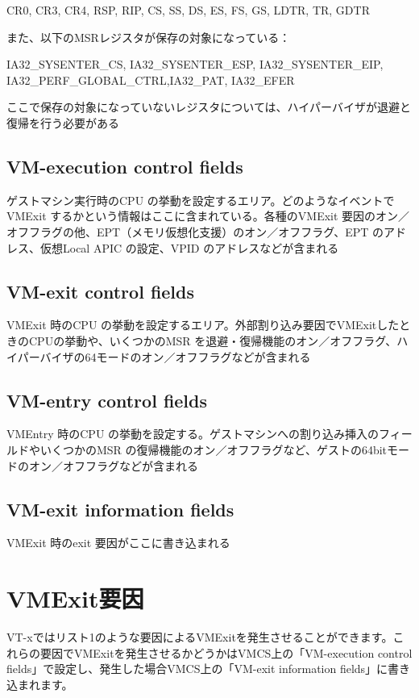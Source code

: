 CR0, CR3, CR4, RSP, RIP, CS, SS, DS, ES, FS, GS, LDTR, TR, GDTR

また、以下のMSRレジスタが保存の対象になっている：

IA32\_SYSENTER\_CS, IA32\_SYSENTER\_ESP, IA32\_SYSENTER\_EIP, IA32\_PERF\_GLOBAL\_CTRL,IA32\_PAT, IA32\_EFER

ここで保存の対象になっていないレジスタについては、ハイパーバイザが退避と復帰を行う必要がある

\subsection*{VM-execution control fields}
ゲストマシン実行時のCPU の挙動を設定するエリア。どのようなイベントでVMExit するかという情報はここに含まれている。各種のVMExit 要因のオン／オフフラグの他、EPT（メモリ仮想化支援）のオン／オフフラグ、EPT のアドレス、仮想Local APIC の設定、VPID のアドレスなどが含まれる

\subsection*{VM-exit control fields}
VMExit 時のCPU の挙動を設定するエリア。外部割り込み要因でVMExitしたときのCPUの挙動や、いくつかのMSR を退避・復帰機能のオン／オフフラグ、ハイパーバイザの64モードのオン／オフフラグなどが含まれる

\subsection*{VM-entry control fields}
VMEntry 時のCPU の挙動を設定する。ゲストマシンへの割り込み挿入のフィールドやいくつかのMSR の復帰機能のオン／オフフラグなど、ゲストの64bitモードのオン／オフフラグなどが含まれる

\subsection*{VM-exit information fields}
VMExit 時のexit 要因がここに書き込まれる

\section{VMExit要因}
VT-xではリスト1のような要因によるVMExitを発生させることができます。これらの要因でVMExitを発生させるかどうかはVMCS上の「VM-execution control fields」で設定し、発生した場合VMCS上の「VM-exit information fields」に書き込まれます。

